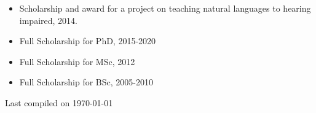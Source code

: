 \documentclass[9pt,a4paper]{article} %
\begin{document}
\spacedhrule{0.5em}{-0.4em} %


\begin{itemize}
    \item Scholarship and award for a project on teaching natural languages to hearing impaired, 2014.
    \item Full Scholarship for PhD, 2015-2020
    \item Full Scholarship for MSc, 2012 
    \item Full Scholarship for BSc, 2005-2010
\end{itemize}

\spacedhrule{0.5em}{-0.4em} %

\vfill \hfill \small Last compiled on \today
\end{document}
